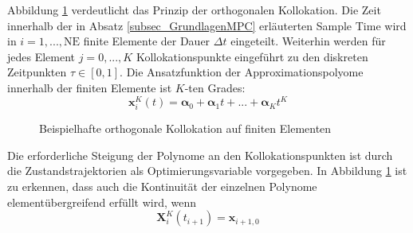 Abbildung \ref{fig_Collocationdompc} verdeutlicht das Prinzip der orthogonalen Kollokation.
Die Zeit innerhalb der in Absatz \ref{subsec_GrundlagenMPC} erläuterten Sample Time wird in $i = 1,...,\mathrm{NE}$ finite Elemente der Dauer $\Delta t$ eingeteilt.
Weiterhin werden für jedes Element $j = 0,...,K$ Kollokationspunkte eingeführt zu den diskreten Zeitpunkten $\tau\in [0,1]$.
Die Ansatzfunktion der Approximationspolyome innerhalb der finiten Elemente ist $K$-ten Grades:
\begin{equation} \label{eq_AnsatzApprox}
    \boldsymbol{x}^{K}_{i}(t) = \boldsymbol{\alpha}_0+\boldsymbol{\alpha}_1t+...+\boldsymbol{\alpha}_{K}t^{K}
\end{equation}

\begin{figure}[h!]
    \centering
    \setlength{\fboxsep}{1pt}
    \setlength{\fboxrule}{1pt}
    \caption[Beispielhafte orthogonale Kollokation auf finiten Elementen]{Beispielhafte orthogonale Kollokation auf finiten Elementen \cite{Dompc1}}
    \label{fig_Collocationdompc}
\end{figure}

Die erforderliche Steigung der Polynome an den Kollokationspunkten ist durch die Zustandstrajektorien als Optimierungsvariable vorgegeben.
In Abbildung \ref{fig_Collocationdompc} ist zu erkennen, dass auch die Kontinuität der einzelnen Polynome elementübergreifend erfüllt wird, wenn
\begin{equation} \label{eq_KontiDompc}
    \boldsymbol{X}^{K}_{i}(t_{i+1})=\boldsymbol{x}_{i+1,0}
\end{equation}

